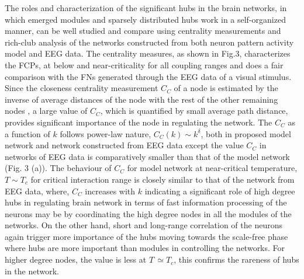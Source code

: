 \documentclass[preprintnumbers,amsmath,amssymb,onecolumn]{revtex4}
\begin{document}
{\noindent}The roles and characterization of the significant hubs in the brain networks, in which emerged modules and sparsely distributed hubs work in a self-organized manner, can be well studied and compare using centrality measurements and rich-club analysis of the networks constructed from both neuron pattern activity model and EEG data. The centrality measures, as shown in Fig.3, characterizes the FCPs, at below and near-criticality for all coupling ranges and does a fair comparison with the FNs generated through the EEG data of a visual stimulus. Since the closeness centrality measurement $C_C$ of a node is estimated by the inverse of average distances of the node with the rest of the other remaining nodes \citep{Freeman1978}, a large value of $C_C$, which is quantified by small average path distance, provides significant importance of the node in regulating the network. The $C_C$ as a function of $k$ follows power-law nature, $C_C(k)\sim k^{\delta}$, both in proposed model network and network constructed from EEG data except the value $C_C$ in networks of EEG data is comparatively smaller than that of the model network (Fig. 3 (a)). The behaviour of $C_C$ for model network at near-critical temperature, $T\sim T_c$ for critical interaction range is closely similar to that of the network from EEG data, where, $C_C$ increases with $k$ indicating a significant role of high degree hubs in regulating brain network in terms of fast information processing of the neurons may be by coordinating the high degree nodes in all the modules of the networks. On the other hand, short and long-range correlation of the neurons again trigger more importance of the hubs moving towards the scale-free phase where hubs are more important than modules in controlling the networks. For higher degree nodes, the value is less at $T\,\simeq$$T_{c}$, this confirms the rareness of hubs in the network.\\
\end{document}
